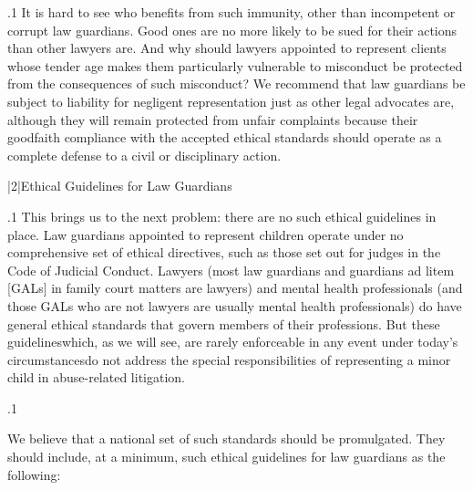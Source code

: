 \documentclass[11pt, twoside]{article}
\begin{document}
{\p.1{%
It is hard to see who benefits from such immunity, other than incompetent or corrupt law guardians. Good ones are no more likely to be
sued for their actions than other lawyers are. And why should lawyers
appointed to represent clients whose tender age makes them particularly
vulnerable to misconduct be protected from the consequences of such
misconduct? We recommend that law guardians be subject to liability
for negligent representation just as other legal advocates are, although
they will remain protected from unfair complaints because their goodfaith compliance with the accepted ethical standards should operate as
a complete defense to a civil or disciplinary action.
}%


\s|2|{Ethical Guidelines for Law Guardians}

\p.1{%
\noindent{}This brings us to the next problem: there are no such ethical guidelines in place. Law guardians appointed to represent children operate under no comprehensive set of ethical directives, such as those
set out for judges in the Code of Judicial Conduct. Lawyers (most
law guardians and guardians ad litem [GALs] in family court matters are lawyers) and mental health professionals (and those GALs
who are not lawyers are usually mental health professionals) do have
general ethical standards that govern members of their professions.
But these guidelines\mdash{}which, as we will see, are rarely enforceable
in any event under today’s circumstances\mdash{}do not address the special responsibilities of representing a minor child in abuse-related
litigation.
}%

\p.1{%
We believe that a national set of such standards should be promulgated. They should include, at a minimum, such ethical guidelines for
law guardians as the following:

\begin{docEnumerate}


\end{docEnumerate}}}
\end{document}
